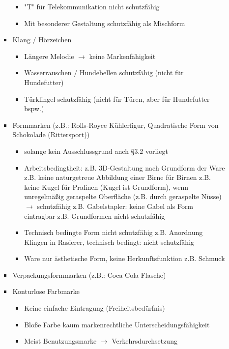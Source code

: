 \documentclass{report}
\begin{document}
\begin{itemize}
\begin{itemize}
\begin{itemize}
\begin{itemize}
				\item "T" für Telekommunikation nicht schutzfähig
				\item Mit besonderer Gestaltung schutzfähig als Mischform
			\end{itemize}
			\item Klang / Hörzeichen
			\begin{itemize}
				\item Längere Melodie $\rightarrow$ keine Markenfähigkeit
				\item Wasserrauschen / Hundebellen schutzfähig (nicht für Hundefutter)
				\item Türklingel schutzfähig (nicht für Türen, aber für Hundefutter bspw.)
			\end{itemize}
			\item Formmarken (z.B.: Rolls-Royce Kühlerfigur, Quadratische Form von Schokolade (Rittersport))
			\begin{itemize}
				\item solange kein Ausschlussgrund anch §3.2 vorliegt
				\item Arbeitsbedingtheit: z.B. 3D-Gestaltung nach Grundform der Ware
				\newline z.B. keine naturgetreue Abbildung einer Birne für Birnen
				\newline z.B. keine Kugel für Pralinen (Kugel ist Grundform), wenn unregelmäßig geraspelte Oberfläche (z.B. durch geraspelte Nüsse) $\rightarrow$ schutzfähig
				\newline z.B. Gabelstapler: keine Gabel als Form eintragbar
				\newline z.B. Grundformen nicht schutzfähig
				\item Technisch bedingte Form nicht schutzfähig
				\newline z.B. Anordnung Klingen in Rasierer, technisch bedingt: nicht schutzfähig
				\item Ware nur ästhetische Form, keine Herkunftsfunktion
				\newline z.B. Schmuck
			\end{itemize}
			\item Verpackungsformmarken (z.B.: Coca-Cola Flasche)
			\item Konturlose Farbmarke
			\begin{itemize}
				\item Keine einfache Eintragung (Freiheitsbedürfnis)
				\item Bloße Farbe kaum markenrechtliche Unterscheidungsfähigkeit
				\item Meist Benutzungsmarke $\rightarrow$ Verkehrsdurchsetzung

\end{itemize}
\end{itemize}
\end{itemize}
\end{itemize}
\end{document}
